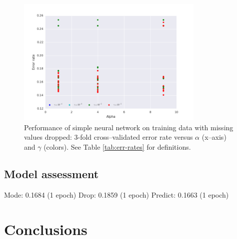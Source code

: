 \documentclass[10pt,twocolumn,letterpaper]{article}
\begin{document}
\begin{figure}[htbp] 
   \centering
   \includegraphics[width=0.8\textwidth]{./figure/drop-2d.png}
   \caption{Performance of simple neural network on training data with missing values dropped: 3-fold cross--validated error rate versus $\alpha$ (x--axis) and $\gamma$ (colors). See Table \ref{tab:err-rates} for definitions.}
   \label{fig:barplot-missing}
\end{figure}

\subsection{Model assessment}

Mode: 0.1684 (1 epoch)
Drop: 0.1859 (1 epoch)
Predict: 0.1663 (1 epoch) 

\section{Conclusions} \label{section:Con}


{\small


}
\end{document}
